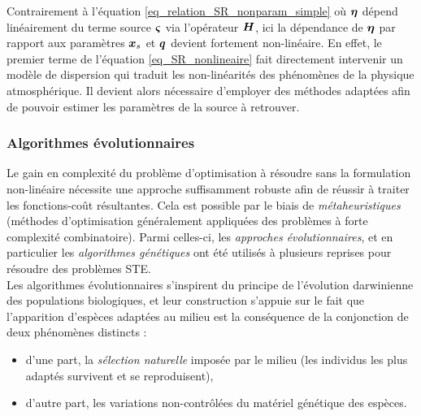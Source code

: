 Contrairement à l'équation \eqref{eq_relation_SR_nonparam_simple} où ${\bm{\eta}}$ dépend linéairement du terme source ${\bm{\varsigma}}$ via l'opérateur ${\bm{H}}$, ici la dépendance de ${\bm{\eta}}$ par rapport aux paramètres ${\bm{x}_s}$ et ${\bm{q}}$ devient fortement non-linéaire. En effet, le premier terme de l'équation \eqref{eq_SR_nonlineaire} fait directement intervenir un modèle de dispersion  qui traduit les non-linéarités des phénomènes de la physique atmosphérique. Il devient alors nécessaire d'employer des méthodes adaptées afin de pouvoir estimer les paramètres de la source à retrouver.

\subsubsection{Algorithmes évolutionnaires}

Le gain en complexité du problème d'optimisation à résoudre sans la formulation non-linéaire nécessite une approche suffisamment robuste afin de réussir à traiter les fonctions-coût résultantes. Cela est possible par le biais de \textit{métaheuristiques} (méthodes d'optimisation généralement appliquées des problèmes à forte complexité combinatoire). Parmi celles-ci, les \textit{approches évolutionnaires}, et en particulier les \textit{algorithmes génétiques} ont été utilisés à plusieurs reprises pour résoudre des problèmes STE.\\
Les algorithmes évolutionnaires s'inspirent du principe de l'évolution darwinienne des populations biologiques, et leur construction s'appuie sur le fait que l'apparition d'espèces adaptées au milieu est la conséquence de la conjonction de deux phénomènes distincts : 

 \begin{itemize}
 	\item d'une part, la \textit{sélection naturelle} imposée par le milieu (les individus les plus adaptés survivent et se reproduisent),
 	\item d'autre part, les variations non-contrôlées du matériel génétique des espèces.
 \end{itemize}
 
